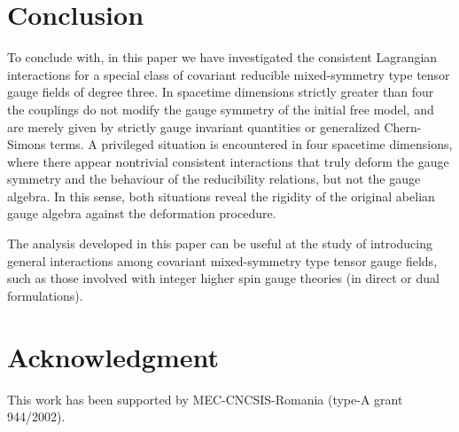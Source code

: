 \documentclass[a4paper,12pt]{article}
\begin{document}
\section{Conclusion}

To conclude with, in this paper we have investigated the consistent
Lagrangian interactions for a special class of covariant reducible
mixed-symmetry type tensor gauge fields of degree three. In spacetime
dimensions strictly greater than four the couplings do not modify the gauge
symmetry of the initial free model, and are merely given by strictly gauge
invariant quantities or generalized Chern-Simons terms. A privileged
situation is encountered in four spacetime dimensions, where there appear
nontrivial consistent interactions that truly deform the gauge symmetry and
the behaviour of the reducibility relations, but not the gauge algebra. In
this sense, both situations reveal the rigidity of the original abelian
gauge algebra against the deformation procedure.

The analysis developed in this paper can be useful at the study of
introducing general interactions among covariant mixed-symmetry type tensor
gauge fields, such as those involved with integer higher spin gauge theories
(in direct or dual formulations).

\section*{Acknowledgment}

This work has been supported by MEC-CNCSIS-Romania (type-A grant 944/2002).
\end{document}
